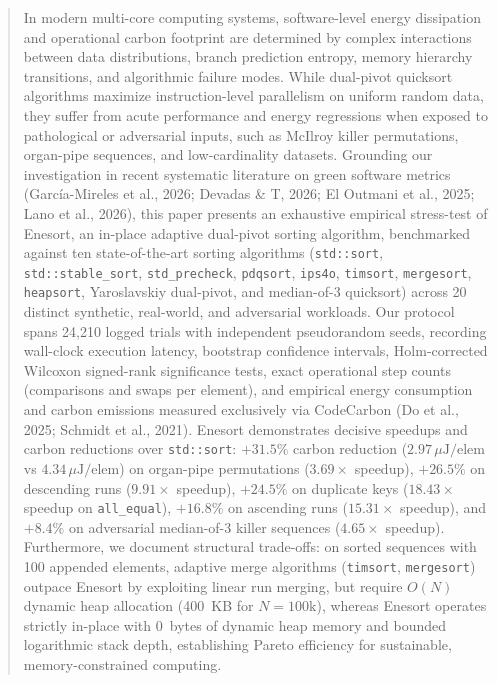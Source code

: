 \documentclass[journal]{IEEEtran}
\begin{document}
\begin{abstract}
In modern multi-core computing systems, software-level energy dissipation and operational carbon footprint are determined by complex interactions between data distributions, branch prediction entropy, memory hierarchy transitions, and algorithmic failure modes. While dual-pivot quicksort algorithms maximize instruction-level parallelism on uniform random data, they suffer from acute performance and energy regressions when exposed to pathological or adversarial inputs, such as McIlroy killer permutations, organ-pipe sequences, and low-cardinality datasets. Grounding our investigation in recent systematic literature on green software metrics (Garc\'ia-Mireles et al., 2026; Devadas \& T, 2026; El Outmani et al., 2025; Lano et al., 2026), this paper presents an exhaustive empirical stress-test of Enesort, an in-place adaptive dual-pivot sorting algorithm, benchmarked against ten state-of-the-art sorting algorithms (\texttt{std::sort}, \texttt{std::stable\_sort}, \texttt{std\_precheck}, \texttt{pdqsort}, \texttt{ips4o}, \texttt{timsort}, \texttt{mergesort}, \texttt{heapsort}, Yaroslavskiy dual-pivot, and median-of-3 quicksort) across 20 distinct synthetic, real-world, and adversarial workloads. Our protocol spans 24,210 logged trials with independent pseudorandom seeds, recording wall-clock execution latency, bootstrap confidence intervals, Holm-corrected Wilcoxon signed-rank significance tests, exact operational step counts (comparisons and swaps per element), and empirical energy consumption and carbon emissions measured exclusively via CodeCarbon (Do et al., 2025; Schmidt et al., 2021). Enesort demonstrates decisive speedups and carbon reductions over \texttt{std::sort}: $+31.5\%$ carbon reduction ($2.97\,\mu\text{J}/\text{elem}$ vs $4.34\,\mu\text{J}/\text{elem}$) on organ-pipe permutations ($3.69\times$ speedup), $+26.5\%$ on descending runs ($9.91\times$ speedup), $+24.5\%$ on duplicate keys ($18.43\times$ speedup on \texttt{all\_equal}), $+16.8\%$ on ascending runs ($15.31\times$ speedup), and $+8.4\%$ on adversarial median-of-3 killer sequences ($4.65\times$ speedup). Furthermore, we document structural trade-offs: on sorted sequences with 100 appended elements, adaptive merge algorithms (\texttt{timsort}, \texttt{mergesort}) outpace Enesort by exploiting linear run merging, but require $O(N)$ dynamic heap allocation (400~KB for $N=100\text{k}$), whereas Enesort operates strictly in-place with 0~bytes of dynamic heap memory and bounded logarithmic stack depth, establishing Pareto efficiency for sustainable, memory-constrained computing.
\end{abstract}
\end{document}
